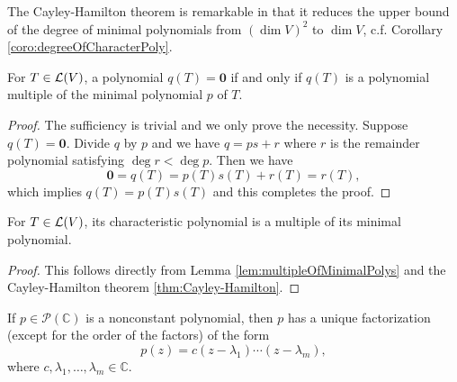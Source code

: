 \begin{rem}
  The Cayley-Hamilton theorem is remarkable in that
  it reduces the upper bound of the degree of minimal polynomials
  from $(\dim V)^2$ to $\dim V$,
  c.f. Corollary \ref{coro:degreeOfCharacterPoly}. 
\end{rem}

\begin{lem}
  \label{lem:multipleOfMinimalPolys}
  For $T\in{\cal L}(V)$,
  a polynomial $q(T)=\mathbf{0}$ if and only if $q(T)$
  is a polynomial multiple of the minimal polynomial $p$ of $T$.
\end{lem}
\begin{proof}
  The sufficiency is trivial and we only prove the necessity.
  Suppose $q(T)=\mathbf{0}$.
  Divide $q$ by $p$ and we have $q=ps+r$
  where $r$ is the remainder polynomial
  satisfying $\deg r< \deg p$.
  Then we have
  \begin{displaymath}
    \mathbf{0} = q(T) = p(T)s(T) + r(T) = r(T),
  \end{displaymath}
  which implies $q(T)=p(T)s(T)$ and this completes the proof.
\end{proof}

\begin{coro}
  \label{coro:characterPolyIsMultipleOfMinimalPolys}
  For $T\in{\cal L}(V)$,
  its characteristic polynomial is a multiple of
  its minimal polynomial.
\end{coro}
\begin{proof}
  This follows directly from Lemma \ref{lem:multipleOfMinimalPolys}
  and the Cayley-Hamilton theorem \ref{thm:Cayley-Hamilton}. 
\end{proof}

\begin{thm}%
  \label{thm:polyFactorization}
  If $p\in \mathcal{P}(\mathbb{C})$ is a nonconstant polynomial,
  then $p$ has a unique factorization (except for the order of the factors)
  of the form
  \begin{equation}
    \label{eq:polyFactorization}
    p(z) = c(z-\lambda_1)\cdots(z-\lambda_m),
  \end{equation}
  where $c,\lambda_1,\ldots,\lambda_m\in \mathbb{C}$.
\end{thm}


